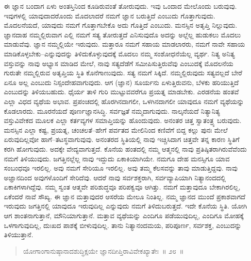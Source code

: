 ಈ ಜ್ಞಾನ ಬಂದಾಗ ಏಳು ಅಂತಸ್ತಿನಿಂದ ಕೂಡಿರುವಂತೆ ತೋರುವುದು. ಇವು ಒಂದಾದ ಮೇಲೊಂದು ಬರುವುವು. ಇವುಗಳಲ್ಲಿ ಯಾವುದಾದರೊಂದು ಮೊದಲಾದರೆ ನಮಗೆ ಜ್ಞಾನ ಬರುತ್ತಿದೆ ಎಂಬುದು ಗೊತ್ತಾಗುವುದು. ಮೊದಲನೆಯದೆ, ಯಾವುದು ನಮಗೆ ಗೊತ್ತಾಗಬೇಕೊ ಅದು ಗೊತ್ತಿದೆ ಎಂಬುದು. ಮನಸ್ಸಿನ ಅತೃಪ್ತಿ ನಿಲ್ಲುವುದು. ಜ್ಞಾನದಾಹ ನಮ್ಮಲ್ಲಿರುವಾಗ ಎಲ್ಲಿ ನಮಗೆ ಸತ್ಯ ತೋರುತ್ತದೆ ಎನಿಸುವುದೊ ಅದನ್ನು ಅಲ್ಲೆಲ್ಲ ಹುಡುಕಲು ಮೊದಲು ಮಾಡುವೆವು. ಜ್ಞಾನ ನಮ್ಮಲ್ಲಿಯೇ ಇರುವುದು. ಮತ್ತಾರೂ ನಮಗೆ ಸಹಾಯ ಮಾಡಲಾರರು, ನಮಗೆ ನಾವೇ ಸಹಾಯ ಮಾಡಿಕೊಳ್ಳಬೇಕು–ಎನ್ನುವುದನ್ನು ತಿಳಿದುಕೊಳ್ಳುವುದಕ್ಕೆ ಮೊದಲು ನಮ್ಮ ಸಂಶೋಧನೆಯೆಲ್ಲ ವ್ಯರ್ಥ. ನಿತ್ಯ ಅನಿತ್ಯ ವಸ್ತುವನ್ನು ನಾವು ಅಭ್ಯಾಸ ಮಾಡಿದ ಮೇಲೆ, ನಾವು ಸತ್ಯದೆಡೆಗೆ ಸಮೀಪಿಸುತ್ತಿರುವೆವು ಎಂಬುದಕ್ಕೆ ಮೊದಲನೆಯ ಗುರುತೇ ನಮ್ಮಲ್ಲಿರುವ ಅತೃಪ್ತಿಯ ಸ್ಥಿತಿ ಕೊನೆಗಾಣುವುದು. ಸತ್ಯ ನಮಗೆ ಸಿಕ್ಕಿದೆ. ನಮ್ಮಲ್ಲಿರುವುದು ಸತ್ಯವಲ್ಲದೆ ಬೇರೆ ಏನೂ ಅಲ್ಲ ಎಂಬುದು ನಿಸ್ಸಂದೇಹವಾಗುವುದು. ಆಗ (ಜ್ಞಾನ) ಸೂರ್ಯನು ಏಳುತ್ತಿರುವನು, ಬೆಳಕು ಹರಿಯುತ್ತಿದೆ ಎಂಬುದನ್ನು ತಿಳಿಯಬಹುದು. ಧೈರ್ಯ ತಾಳಿ ಗುರಿ ಮುಟ್ಟುವವರೆಗೂ ಪ್ರಯತ್ನ ಮಾಡಬೇಕು. ಎರಡನೆಯ ಹಂತವೆ ಎಲ್ಲಾ ವಿಧದ ವ್ಯಥೆಯ ಅಭಾವ. ಪ್ರಪಂಚದಲ್ಲಿ ಹೊರಗಿನದಾಗಲೀ, ಒಳಗಿನದಾಗಲೀ ಯಾವುದೂ ನಮಗೆ ವ್ಯಥೆಯನ್ನು ಕೊಡಲಾರದು. ಮೂರನೆಯದೆ ಪೂರ್ಣಜ್ಞಾನಸಿದ್ಧಿ. ಸರ್ವಜ್ಞತೆ ನಮ್ಮದಾಗುವುದು. ನಾಲ್ಕನೆಯದೆ ನಿತ್ಯಾನಿತ್ಯ ವಸ್ತುವಿವೇಕದ ಮೂಲಕ ಎಲ್ಲಾ ಕರ್ತವ್ಯಗಳ ಸಮಾಪ್ತಿಯನ್ನು ಹೊಂದುವುದು. ಅನಂತರ ಚಿತ್ತ ಸ್ವಾತಂತ್ರ್ಯ ಬರುವುದು. ಮನಸ್ಸಿನ ಎಲ್ಲಾ ಕಷ್ಟ, ಪ್ರಯತ್ನ, ಚಂಚಲತೆ–ಹೇಗೆ ಪರ್ವತದ ಮೇಲಿನಿಂದ ಕಣಿವೆಗೆ ಬಿದ್ದ ಕಲ್ಲು ಪುನಃ ಮೇಲೆ ಏರುವುದಿಲ್ಲವೋ ಹಾಗೆ–ತಟಸ್ಥವಾಗುವುವು. ಅನಂತರದ ಸ್ಥಿತಿಯಲ್ಲಿ ನಾವು ಇಚ್ಚಿಸಿದಾಗ ಚಿತ್ತವೇ ತನ್ನ ಕಾರಣ ಸ್ಥಿತಿಗೆ ಕರಗಿ ಹೋಗುವುದು. ಅದಕ್ಕೇ ವೇದ್ಯವಾಗುತ್ತದೆ. ಕೊನೆಯ ಹಂತದಲ್ಲಿ ನಮ್ಮ ಆತ್ಮನಲ್ಲಿ ನಾವು ಪ್ರತಿಷ್ಠಿತರಾಗಿರುವೆವೆಂದು ನಮಗೆ ತಿಳಿಯುವುದು. ಜಗತ್ತಿನಲ್ಲೆಲ್ಲ ನಾವು ಇದ್ದುದು ಏಕಾಕಿಯಾಗಿಯೇ. ನಮಗೂ ದೇಹ ಮನಸ್ಸಿಗೂ ಯಾವ ಸಂಬಂಧವೂ ಇರಲಿಲ್ಲ. ಅವು ನಮಗೆ ಸೇರಿಯೂ ಇರಲಿಲ್ಲ. ಅವು ತಮ್ಮ ಕೆಲಸವನ್ನು ತಾವು ಮಾಡುತ್ತಿದ್ದವು. ನಾವು ಅಜ್ಞಾನದಿಂದ ಅವುಗಳೊಂದಿಗೆ ಸೇರಿದೆವು. ಆದರೆ ನಾವು ಸರ್ವಶಕ್ತರಾಗಿ, ಸರ್ವವ್ಯಾಪಿಯಾಗಿ ನಿತ್ಯಾನಂದದಲ್ಲಿ ಏಕಾಕಿಗಳಾಗಿದ್ದೆವು. ನಮ್ಮ ಸ್ವಂತ ಆತ್ಮವೇ ಪರಿಶುದ್ಧವೂ ಪರಿಪಕ್ವವೂ ಆಗಿತ್ತು. ನಮಗೆ ಮತ್ತಾವುದೂ ಬೇಕಾಗಿರಲಿಲ್ಲ, ಏಕೆಂದರೆ ನಾವೆ ಸೌಖ್ಯ. ಈ ಜ್ಞಾನ ಮತ್ತಾವುದರ ಆಸರೆಯ ಮೇಲೂ ನಿಂತಿಲ್ಲ. ನಮ್ಮ ಜ್ಞಾನದ ಮುಂದೆ ಪ್ರಕಾಶವಾಗದೆ ಇರುವುದು ಜಗತ್ತಿನಲ್ಲಿ ಯಾವುದೂ ಇರುವುದಿಲ್ಲ ಎನ್ನುವುದು ನಮಗೆ ತಿಳಿದುಬರುತ್ತದೆ. ಇದೇ ಕೊನೆಯ ಸ್ಥಿತಿ. ಯೋಗಿ ಆಗ ಶಾಂತನಾಗುತ್ತಾನೆ, ಮೌನಿಯಾಗುತ್ತಾನೆ. ಮತ್ತಾವ ವ್ಯಥೆಯನ್ನು ಎಂದಿಗೂ ಪಡೆಯುವುದಿಲ್ಲ, ಎಂದಿಗೂ ಮೋಹಕ್ಕೆ ಒಳಗಾಗುವುದಿಲ್ಲ, ದುಃಖದ ಪಾಶಕ್ಕೆ ಬೀಳುವುದಿಲ್ಲ. ತಾನು ನಿತ್ಯಾನಂದಮಯ, ಪರಿಪೂರ್ಣ, ಸರ್ವಶಕ್ತ, ಎಂಬುದನ್ನು ತಿಳಿಯುತ್ತಾನೆ. 

\eject

\begin{verse}
ಯೋಗಾಂಗಾನುಷ್ಠಾನಾದಶುದ್ಧಿಕ್ಷಯೇ ಜ್ಞಾನದೀಪ್ತಿರಾವಿವೇಕಖ್ಯಾತೇಃ~॥ ೨೮~॥
\end{verse}

\vspace{-0.3cm}


